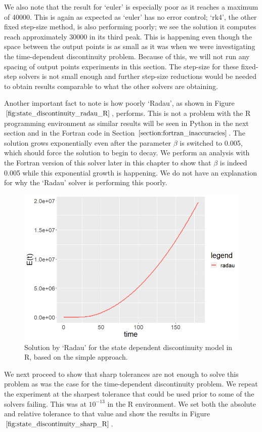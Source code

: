 We also note that the result for `euler' is especially poor as it reaches a maximum of 40000. This is again as expected as `euler' has no error control; `rk4', the other fixed step-size method, is also performing poorly; we see the solution it computes reach approximately 30000 in its third peak. This is happening even though the space between the output points is as small as it was when we were investigating the time-dependent discontinuity problem. Because of this, we will not run any spacing of output points experiments in this section. The step-size for these fixed-step solvers is not small enough and further step-size reductions would be needed to obtain results comparable to what the other solvers are obtaining.

Another important fact to note is how poorly `Radau', as shown in Figure $\ref{fig:state_discontinuity_radau_R}$, performs. This is not a problem with the R programming environment as similar results will be seen in Python in the next section and in the Fortran code in Section $\ref{section:fortran_inaccuracies}$. The solution grows exponentially even after the parameter $\beta$ is switched to 0.005, which should force the solution to begin to decay. We perform an analysis with the Fortran version of this solver later in this chapter to show that $\beta$ is indeed 0.005 while this exponential growth is happening. We do not have an explanation for why the `Radau' solver is performing this poorly.

\begin{figure}[h]
\centering
\includegraphics[width=0.7\linewidth]{./figures/state_discontinuity_radau_R}
\caption{Solution by `Radau' for the state dependent discontinuity model in R, based on the simple approach.}
\label{fig:state_discontinuity_radau_R}
\end{figure}

We next proceed to show that sharp tolerances are not enough to solve this problem as was the case for the time-dependent discontinuity problem. We repeat the experiment at the sharpest tolerance that could be used prior to some of the solvers failing. This was at $10^{-13}$ in the R environment. We set both the absolute and relative tolerance to that value and show the results in Figure $\ref{fig:state_discontinuity_sharp_R}$.

